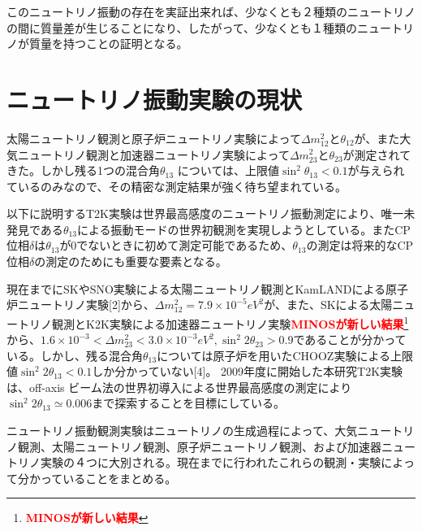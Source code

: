 \documentclass[11pt]{jreport}
\newcommand{\red}[1]{\textcolor{red}{\textbf{#1}}}
\newcommand{\comment}[1]{\red{#1}\footnote{\red{#1}}}
\begin{document}
このニュートリノ振動の存在を実証出来れば、少なくとも２種類のニュートリノの間に質量差が生じることになり、したがって、少なくとも１種類のニュートリノが質量を持つことの証明となる。




\section{ニュートリノ振動実験の現状}
太陽ニュートリノ観測と原子炉ニュートリノ実験によって$\Delta m_{12}^{2}$と$\theta_{12}$が、また大気ニュートリノ観測と加速器ニュートリノ実験によって$\Delta m_{23}^{2}$と$\theta_{23}$が測定されてきた。しかし残る1つの混合角$\theta_{13}$	については、上限値$\sin^{2}\theta_{13}<0.1$が与えられているのみなので、その精密な測定結果が強く待ち望まれている。

以下に説明するT2K実験は世界最高感度のニュートリノ振動測定により、唯一未発見である$\theta_{13}$による振動モードの世界初観測を実現しようとしている。またCP位相$\delta$は$\theta_{13}$が0でないときに初めて測定可能であるため、$\theta_{13}$の測定は将来的なCP位相$\delta$の測定のためにも重要な要素となる。

現在までにSKやSNO実験による太陽ニュートリノ観測とKamLANDによる原子炉ニュートリノ実験[2]から、$\Delta m_{12}^{2}=7.9 \times 10^{-5} eV^{2}$が、また、SKによる太陽ニュートリノ観測とK2K実験による加速器ニュートリノ実験\comment{MINOSが新しい結果}から、$1.6 \times 10^{-3} < \Delta m_{23}^{2} < 3.0 \times 10^{-3} eV^{2}, \sin^{2}2\theta_{23} > 0.9$であることが分かっている。しかし、残る混合角$\theta_{13}$については原子炉を用いたCHOOZ実験による上限値$\sin^{2}2\theta_{13} < 0.1$しか分かっていない[4]。 2009年度に開始した本研究T2K実験は、off-axis ビーム法の世界初導入による世界最高感度の測定により$\sin^{2}2\theta_{13} \simeq 0.006$まで探索することを目標にしている。
\fi

ニュートリノ振動観測実験はニュートリノの生成過程によって、大気ニュートリノ観測、太陽ニュートリノ観測、原子炉ニュートリノ観測、および加速器ニュートリノ実験の４つに大別される。現在までに行われたこれらの観測・実験によって分かっていることをまとめる。
\end{document}

